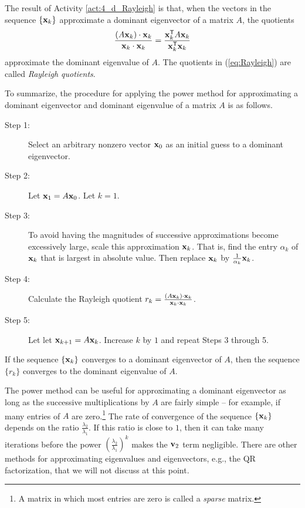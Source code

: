 The result of Activity \ref{act:4_d_Rayleigh} is that, when the vectors in the sequence $\{\mathbf{x}_k\}$  approximate a dominant eigenvector of a matrix $A$, the quotients
\begin{equation} \label{eq:Rayleigh}
\frac{(A\mathbf{x}_k) \cdot \mathbf{x}_k}{\mathbf{x}_k \cdot \mathbf{x}_k} = \frac{\mathbf{x}_k^{\mathsf{T}}A\mathbf{x}_k}{\mathbf{x}_k^{\mathsf{T}}\mathbf{x}_k}
\end{equation}
approximate the dominant eigenvalue of $A$. The quotients in (\ref{eq:Rayleigh}) are called \emph{Rayleigh quotients}. 

 
To summarize, the procedure for applying the power method for approximating a dominant eigenvector and dominant eigenvalue of a matrix $A$ is as follows.
\begin{description}
\item[Step 1:] Select an arbitrary nonzero vector $\mathbf{x}_0$ as an initial guess to a dominant eigenvector.
\item[Step 2:] Let $\mathbf{x}_1 = A\mathbf{x}_0$. Let $k = 1$. 
\item[Step 3:] To avoid having the magnitudes of successive approximations become excessively large, scale this approximation $\mathbf{x}_k$. That is, find the entry $\alpha_k$ of $\mathbf{x}_k$ that is largest in absolute value. Then replace $\mathbf{x}_k$ by $\frac{1}{\alpha_k} \mathbf{x}_k$.  
\item[Step 4:] Calculate the Rayleigh quotient $r_k = \frac{(A\mathbf{x}_{k}) \cdot \mathbf{x}_k}{\mathbf{x}_k \cdot \mathbf{x}_k}$.
\item[Step 5:] Let let $\mathbf{x}_{k+1} = A \mathbf{x}_k$. Increase $k$ by $1$ and repeat Steps 3 through 5.
\end{description}
If the sequence $\{\mathbf{x}_k\}$ converges to a dominant eigenvector of $A$, then the sequence $\{r_k\}$ converges to the dominant eigenvalue of $A$. 

The power method can be useful for approximating a dominant eigenvector as long as the successive multiplications by $A$ are fairly simple -- for example, if many entries of $A$ are zero.\footnote{A matrix in which most entries are zero is called a \emph{sparse} matrix.} The rate of convergence of the sequence $\{\mathbf{x}_k\}$ depends on the ratio $\frac{\lambda_2}{\lambda_1}$. If this ratio is close to $1$, then it can take many iterations before the power $\left(\frac{\lambda_2}{\lambda_1}\right)^k$ makes the $\mathbf{v}_2$ term negligible. There are other methods for approximating eigenvalues and eigenvectors, e.g., the QR factorization, that we will not discuss at this point.   	

